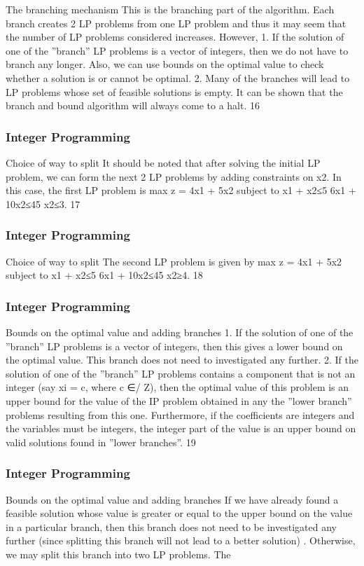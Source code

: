\begin{frame}
The branching mechanism
This is the branching part of the algorithm. Each branch creates 2
LP problems from one LP problem and thus it may seem that the
number of LP problems considered increases. However,
1. If the solution of one of the ”branch” LP problems is
a vector of integers, then we do not have to branch
any longer. Also, we can use bounds on the optimal
value to check whether a solution is or cannot be
optimal.
2. Many of the branches will lead to LP problems whose
set of feasible solutions is empty.
It can be shown that the branch and bound algorithm will always
come to a halt.
16 \end{frame}  \begin{frame} \frametitle{Integer Programming}     
Choice of way to split
It should be noted that after solving the initial LP problem, we can
form the next 2 LP problems by adding constraints on x2. In this
case, the first LP problem is
max z = 4x1 + 5x2
subject to
x1 + x2≤5
6x1 + 10x2≤45
x2≤3.
17 \end{frame}  \begin{frame} \frametitle{Integer Programming}     
Choice of way to split
The second LP problem is given by
max z = 4x1 + 5x2
subject to
x1 + x2≤5
6x1 + 10x2≤45
x2≥4.
18 \end{frame}  \begin{frame} \frametitle{Integer Programming}     
Bounds on the optimal value and adding branches
1. If the solution of one of the ”branch” LP problems is
a vector of integers, then this gives a lower bound on
the optimal value. This branch does not need to
investigated any further.
2. If the solution of one of the ”branch” LP problems
contains a component that is not an integer (say
xi = c, where c ∈/ Z), then the optimal value of this
problem is an upper bound for the value of the IP
problem obtained in any the ”lower branch” problems
resulting from this one. Furthermore, if the
coefficients are integers and the variables must be
integers, the integer part of the value is an upper
bound on valid solutions found in ”lower branches”.
19 \end{frame}  \begin{frame} \frametitle{Integer Programming}     
Bounds on the optimal value and adding branches
If we have already found a feasible solution whose value is greater
or equal to the upper bound on the value in a particular branch,
then this branch does not need to be investigated any further
(since splitting this branch will not lead to a better solution) .
Otherwise, we may split this branch into two LP problems. The

\end{frame}
